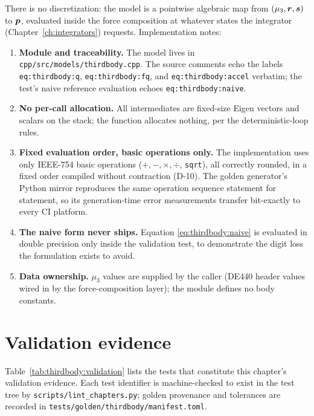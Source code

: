 There is no discretization: the model is a pointwise algebraic map from
$(\mu_3, \bm{r}, \bm{s})$ to $\bm{p}$, evaluated inside the force
composition at whatever states the integrator (Chapter~\ref{ch:integrators})
requests. Implementation notes:
\begin{enumerate}
  \item \textbf{Module and traceability.} The model lives in
    \texttt{cpp/src/models/thirdbody.cpp}. The source comments echo the
    labels \texttt{eq:thirdbody:q}, \texttt{eq:thirdbody:fq}, and
    \texttt{eq:thirdbody:accel} verbatim; the test's naive reference
    evaluation echoes \texttt{eq:thirdbody:naive}.
  \item \textbf{No per-call allocation.} All intermediates are
    fixed-size Eigen vectors and scalars on the stack; the function
    allocates nothing, per the deterministic-loop rules.
  \item \textbf{Fixed evaluation order, basic operations only.} The
    implementation uses only IEEE-754 basic operations
    ($+, -, \times, \div$, \texttt{sqrt}), all correctly rounded, in a
    fixed order compiled without contraction (D-10). The golden
    generator's Python mirror reproduces the same operation sequence
    statement for statement, so its generation-time error measurements
    transfer bit-exactly to every CI platform.
  \item \textbf{The naive form never ships.} Equation
    \eqref{eq:thirdbody:naive} is evaluated in double precision only
    inside the validation test, to demonstrate the digit loss the
    formulation exists to avoid.
  \item \textbf{Data ownership.} $\mu_3$ values are supplied by the
    caller (DE440 header values wired in by the force-composition
    layer); the module defines no body constants.
\end{enumerate}

\section{Validation evidence}
\label{sec:thirdbody:validation}

Table~\ref{tab:thirdbody:validation} lists the tests that constitute this
chapter's validation evidence. Each test identifier is machine-checked to
exist in the test tree by \texttt{scripts/lint\_chapters.py}; golden
provenance and tolerances are recorded in
\texttt{tests/golden/thirdbody/manifest.toml}.

